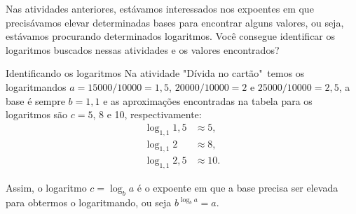 Nas atividades anteriores, estávamos interessados nos expoentes em que precisávamos elevar determinadas bases para encontrar alguns valores, ou seja, estávamos procurando determinados logaritmos. Você consegue identificar os logaritmos buscados nessas atividades e os valores encontrados?  

\begin{example}{Identificando os logaritmos}
Na atividade "Dívida no cartão"\, temos os logaritmandos $a=15000/10000=1,5$, $20000/10000=2$ e $25000/10000=2,5$, a base é sempre $b= 1,1$ e as aproximações encontradas na tabela para os logaritmos são $c= 5$, 8 e 10, respectivamente:
\begin{align*}
\log_{1,1} 1,5 &\approx 5,\\ 
\log_{1,1} 2 &\approx 8,\\
\log_{1,1} 2,5 &\approx 10.
\end{align*}
\end{example}

\begin{observation}{}
Assim, o logaritmo $c = \log_b a$ é o expoente em que a base precisa ser elevada para obtermos o logaritmando, ou seja $b^{\log_b a}=a$.
\end{observation}
\clearpage

